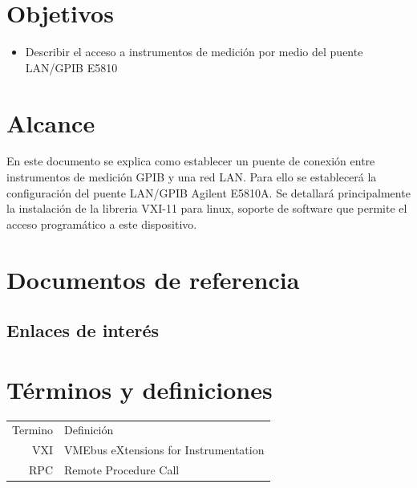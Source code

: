 \documentclass[paper=letter,oneside,fontsize=11pt, parskip=full]{scrartcl}
\newenvironment{link}
	{\ttfamily}{}
\begin{document}
	
	\clearpage
	
	\tableofcontents
	
	\section{Objetivos}
		\begin{itemize}
			\item Describir el acceso a instrumentos de medición por medio del puente LAN/GPIB E5810
		
		\end{itemize}
		
	\section{Alcance}
	
		En este documento se explica como establecer un puente de conexión entre instrumentos de medición GPIB y una red LAN. Para ello se establecerá la configuración del puente LAN/GPIB Agilent E5810A. Se detallará principalmente la instalación de la libreria VXI-11 para linux, soporte de software que permite el acceso programático a este dispositivo.	
		
	\section{Documentos de referencia}
	
		\subsection{Enlaces de interés}

	
			\begin{link}

			\end{link}	
	

	
	\section{Términos y definiciones}
	
		\begin{tabular}{rl}
			Termino 	& 	Definición \\	
			VXI			& 	VMEbus eXtensions for Instrumentation \\
			RPC			& 	Remote Procedure Call \\
		\end{tabular}
	
\end{document}
